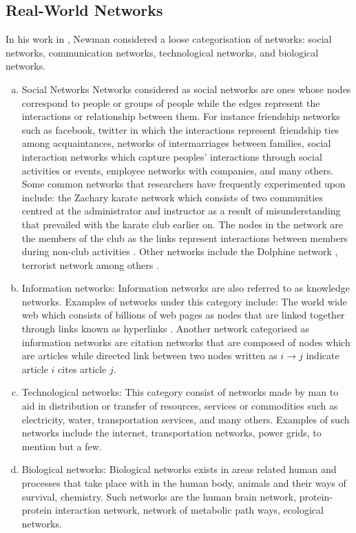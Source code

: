 \documentclass[10pt,a4paper]{article}
\begin{document}
	\subsection{Real-World Networks}
	In his work in \citep{newman2003structure}, Newman considered a loose categorisation of networks: social networks, communication networks, technological networks, and biological networks.
	\begin{enumerate}[a.]
		\item Social Networks
		Networks considered as social networks are ones whose nodes correspond to people or groups of people while the edges represent the interactions or relationship between them. For instance friendship networks such as facebook, twitter in which the interactions represent friendship ties among acquaintances, networks of intermarriages between families, social interaction networks which capture peoples' interactions through social activities or events, employee networks with companies, and many others.
		Some common networks that researchers have frequently experimented upon include: the Zachary karate network which consists of two communities centred at the administrator and instructor as a result of misunderstanding that prevailed with the karate club earlier on. The nodes in the network are the members of the club as the links represent interactions between members during non-club activities \citep{zachary1977information}. Other networks include the Dolphine network \citep{williams1993abundance}, terrorist network\citep{magouirk2008connecting} among others .
		
		\item Information networks: 
		Information networks are also referred to as knowledge networks. Examples of networks under this category include: 
		The world wide web which consists of billions of web pages as nodes that are linked together through links known as hyperlinks \citep{huberman2001laws}.
		Another network categorised as information networks are citation networks that are composed of nodes which are articles while directed link between two nodes written as $i\longrightarrow j$ indicate article $i$ cites article $j$.
		\item Technological networks: 
		This category consist of networks made by man to aid in distribution or transfer of resources, services or commodities such as electricity, water, transportation services, and many others. Examples of such networks include the internet, transportation networks, power grids, to mention but a few.
		\item Biological networks: 
		Biological networks exists in areas related human and processes that take place with in the human body, animals and their ways of survival, chemistry. Such networks are the human brain network, protein-protein interaction network, network of metabolic path ways, ecological networks.
	\end{enumerate}
\end{document}
